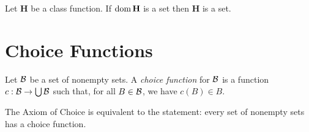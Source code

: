 \begin{axioms}[Replacement]
    Let $\mathbf{H}$ be a class function. If $\operatorname{dom} \mathbf{H}$ is a set
    then $\mathbf{H}$ is a set.
\end{axioms}

\section{Choice Functions}

\begin{definition}
    Let $\mathcal{B}$ be a set of nonempty sets. A \emph{choice function} for $\mathcal{B}$ is a function $c : \mathcal{B} \rightarrow \bigcup \mathcal{B}$ such that, for all $B \in \mathcal{B}$,
    we have $c(B) \in B$.
\end{definition}

\begin{theorem}
    The Axiom of Choice is equivalent to the statement: every set of nonempty sets
    has a choice function.
\end{theorem}

